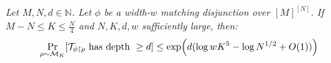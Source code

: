 {\it Let $M,N,d \in \mathbb{N}$. 
Let $\phi$ be a width-$w$ matching disjunction over $[M]^{[N]}$. 
If $M-N \leq K \leq \frac{N}{4}$ and $N,K,d,w$ sufficiently large, then:
\[
\Pr_{\rho \sim \mathcal{M}_K} [\mathcal{T}_{\phi\upharpoonright \rho} \text{ has depth } \geq d] \leq \exp\Bigl(d (\log wK^5 -\log N^{1/2} + O(1))\Bigr)
\]
}

